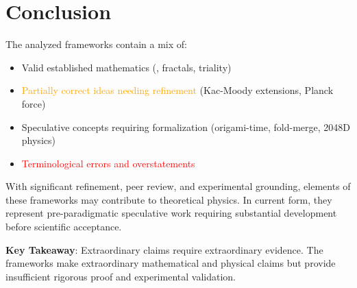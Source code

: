 \section{Conclusion}

The analyzed frameworks contain a mix of:
\begin{itemize}
    \item \textcolor{validcolor}{Valid established mathematics} (, fractals, triality)
    \item \textcolor{orange}{Partially correct ideas needing refinement} (Kac-Moody extensions, Planck force)
    \item \textcolor{claimcolor}{Speculative concepts requiring formalization} (origami-time, fold-merge, 2048D physics)
    \item \textcolor{red}{Terminological errors and overstatements}
\end{itemize}

With significant refinement, peer review, and experimental grounding, elements of these frameworks may contribute to theoretical physics. In current form, they represent pre-paradigmatic speculative work requiring substantial development before scientific acceptance.

\textbf{Key Takeaway}: Extraordinary claims require extraordinary evidence. The frameworks make extraordinary mathematical and physical claims but provide insufficient rigorous proof and experimental validation.
